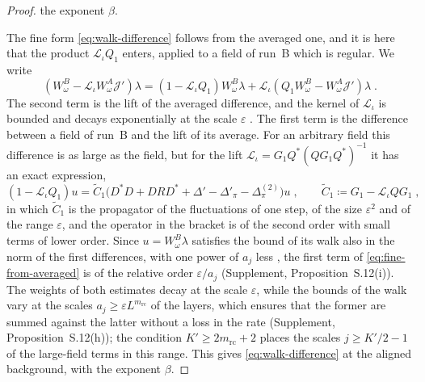 \documentclass[11pt]{preprint}
\numberwithin{equation}{section}
\theoremstyle{definition}
\theoremstyle{remark}
\theoremstyle{plain}
\begin{document}
\begin{proof}
the exponent $\beta$.

The fine form \eqref{eq:walk-difference} follows from the averaged one, and it is here that the product $\mathcal L_\iota Q_1$ enters, applied to a field of run~B which is regular. We write
\begin{equation}\label{eq:fine-from-averaged}
    (W^B_\omega - \mathcal L_\iota W^A_\omega\mathcal J')\lambda = (1 - \mathcal L_\iota Q_1)W^B_\omega\lambda + \mathcal L_\iota(Q_1W^B_\omega - W^A_\omega\mathcal J')\lambda\;.
\end{equation}
The second term is the lift of the averaged difference, and the kernel of $\mathcal L_\iota$ is bounded and decays exponentially at the scale $\varepsilon$ \cite[(3.133), p.~422]{BalabanPBG}. The first term is the difference between a field of run~B and the lift of its average. For an arbitrary field this difference is as large as the field, but for the lift $\mathcal L_\iota = G_1Q^*(QG_1Q^*)^{-1}$ it has an exact expression,
\begin{equation}\label{eq:reconstruction-identity}
    (1 - \mathcal L_\iota Q_1)u = \tilde C_1\bigl(D^*D + DRD^* + \Delta' - \Delta'_\pi - \Delta^{(2)}_\pi\bigr)u\;,
    \qquad
    \tilde C_1 \coloneqq G_1 - \mathcal L_\iota QG_1\;,
\end{equation}
in which $\tilde C_1$ is the propagator of the fluctuations of one step, of the size $\varepsilon^2$ and of the range $\varepsilon$, and the operator in the bracket is of the second order with small terms of lower order. Since $u = W^B_\omega\lambda$ satisfies the bound of its walk also in the norm of the first differences, with one power of $a_j$ less \cite[(3.108)]{BalabanPBG}, the first term of \eqref{eq:fine-from-averaged} is of the relative order $\varepsilon/a_j$ (Supplement, Proposition~S.12(i)). The weights of both estimates decay at the scale $\varepsilon$, while the bounds of the walk vary at the scales $a_j \geq \varepsilon L^{m_{\mathrm{rc}}}$ of the layers, which ensures that the former are summed against the latter without a loss in the rate (Supplement, Proposition~S.12(h)); the condition $K' \geq 2m_{\mathrm{rc}} + 2$ places the scales $j \geq K'/2 - 1$ of the large-field terms in this range. This gives \eqref{eq:walk-difference} at the aligned background, with the exponent $\beta$.


\end{proof}
\end{document}

